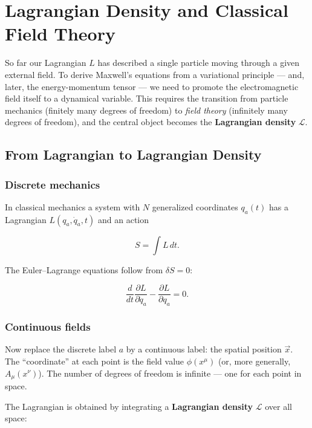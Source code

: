 \chapter{Lagrangian Density and Classical Field Theory}

So far our Lagrangian $L$ has described a single particle moving through a given external field. To derive Maxwell's equations from a variational principle --- and, later, the energy-momentum tensor --- we need to promote the electromagnetic field itself to a dynamical variable. This requires the transition from particle mechanics (finitely many degrees of freedom) to \emph{field theory} (infinitely many degrees of freedom), and the central object becomes the \textbf{Lagrangian density} $\mathcal{L}$.

\section{From Lagrangian to Lagrangian Density}

\subsection*{Discrete mechanics}

In classical mechanics a system with $N$ generalized coordinates $q_a(t)$ has a Lagrangian $L(q_a, \dot{q}_a, t)$ and an action

\begin{equation}
S = \int L\,dt.
\end{equation}

The Euler--Lagrange equations follow from $\delta S = 0$:

\begin{equation}
\frac{d}{dt}\frac{\partial L}{\partial \dot{q}_a} - \frac{\partial L}{\partial q_a} = 0.
\end{equation}

\subsection*{Continuous fields}

Now replace the discrete label $a$ by a continuous label: the spatial position $\vec{x}$. The ``coordinate'' at each point is the field value $\phi(x^\mu)$ (or, more generally, $A_\mu(x^\nu)$). The number of degrees of freedom is infinite --- one for each point in space.

The Lagrangian is obtained by integrating a \textbf{Lagrangian density} $\mathcal{L}$ over all space:


